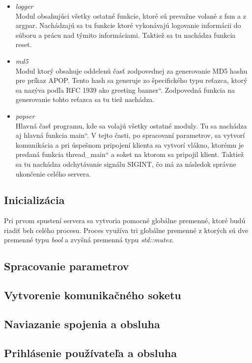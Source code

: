 \documentclass[11pt,a4paper]{article}
\providecommand{\uv}[1]{\quotedblbase #1\textquotedblleft}
\begin{document}
\begin{itemize}
			\item \textit{logger}\\[0.4em]
				Modul obsahujúci všetky ostatné funkcie, ktoré sú prevažne volané z fsm a z argpar. Nachádzajú sa tu funkcie ktoré vykonávajú logovanie informácii do súboru a prácu nad týmito informáciami. Taktiež sa tu nachádza funkcia reset.

			\item \textit{md5}\\[0.4em]
				Modul ktorý obsahuje oddelenú časť zodpovednej za generovanie MD5 hashu pre príkaz APOP. Tento hash sa generuje zo špecifického typu reťazca, ktorý sa nazýva podľa RFC 1939 ako \uv{greeting banner}. Zodpovedná funkcia na generovanie tohto reťazca sa tu tiež nachádza.

			\item \textit{popser}\\[0.4em]
				Hlavná časť programu, kde sa volajú všetky ostatné moduly. Tu sa nachádza aj hlavná funkcia \uv{main}. V tejto časti, po spracovaní parametrov, sa vytvorí komunikácia a pri úspešnom pripojení klienta sa vytvorí vlákno, ktorému je predaná funkcia \uv{thread\_main} a soket na ktorom sa pripojil klient. Taktiež sa tu nachádza odchytávanie signálu SIGINT, čo má za následok správne ukončenie celého servera.

		\end{itemize}

	\subsection{Inicializácia}
		Pri prvom spustení servera sa vytvoria pomocné globálne premenné, ktoré budú riadiť beh celého procesu. Proces využíva tri globálne premenné z ktorých sú dve premenné typu \textit{bool} a zvyšná premenná typu \textit{std::mutex}.

	\subsection{Spracovanie parametrov}
	\subsection{Vytvorenie komunikačného soketu}
	\subsection{Naviazanie spojenia a obsluha}
	\subsection{Prihlásenie používateľa a obsluha}
\end{document}
